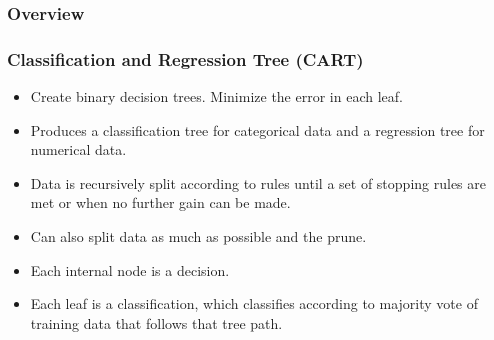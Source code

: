 \documentclass[mathserif]{beamer}
\begin{document}
	\subsubsection{Overview}
	\begin{frame}
		\frametitle{Classification and Regression Tree (CART)}
		\begin{itemize}
			\item Create binary decision trees. Minimize the error in each leaf.
			\item Produces a classification tree for categorical data and a regression tree for numerical data.
			\item Data is recursively split according to rules until a set of stopping rules are met or when no further gain can be made.
			\item Can also split data as much as possible and the prune.
			\item Each internal node is a decision.
			\item Each leaf is a classification, which classifies according to majority vote of training data that follows that tree path.
		\end{itemize}
	\end{frame}
	
\end{document}

